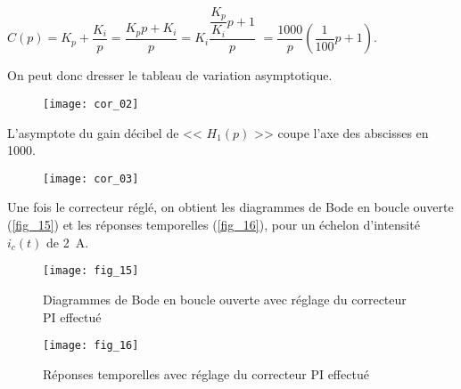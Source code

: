 \ifprof
\begin{corrige}

$C(p)=K_p+\dfrac{K_i}{p}=\dfrac{K_p p + K_i}{p} = K_i \dfrac{\dfrac{K_p}{K_i} p +1 }{p}$
$=\dfrac{1000}{p}\left(\dfrac{1}{100}p+1\right)$. 

On peut donc dresser le tableau de variation asymptotique.

\begin{figure}[H]
\centering
\texttt{[image: cor\_02]}
\end{figure}

L'asymptote du gain décibel de << $H_1(p)$ >> coupe l'axe des abscisses en 1000.

\begin{figure}[H]
\centering
\texttt{[image: cor\_03]}
\end{figure}


\end{corrige}
\else
\fi


%
%

\ifprof
\else
 Une fois le correcteur réglé, on obtient les diagrammes de Bode en boucle ouverte (\autoref{fig_15}) et les réponses temporelles (\autoref{fig_16}), pour un échelon d’intensité $i_c(t)$ de \SI{2}{A}.
 
 \begin{figure}[H]
\centering
\texttt{[image: fig\_15]}
\caption{Diagrammes de Bode en boucle ouverte avec réglage du correcteur PI effectué \label{fig_15}}
\end{figure}


\begin{figure}[H]
\centering
\texttt{[image: fig\_16]}
\caption{Réponses temporelles avec réglage du correcteur PI effectué \label{fig_16}}
\end{figure}


